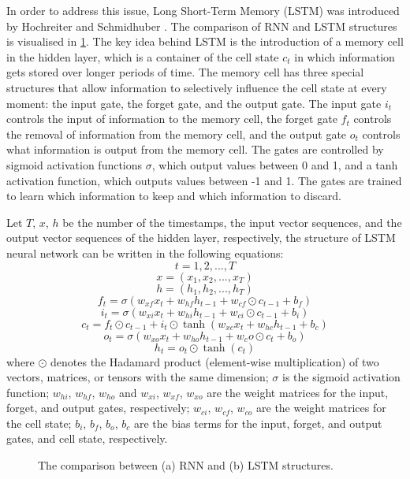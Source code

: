 \documentclass[11pt]{uonthesis}
\begin{document}
In order to address this issue, Long Short-Term Memory (LSTM) was introduced by Hochreiter and Schmidhuber \cite{lstm}. The comparison of RNN and LSTM structures is visualised in \ref{fig:rnnvslstm}. The key idea behind LSTM is the introduction of a memory cell in the hidden layer, which is a container of the cell state $c_t$ in which information gets stored over longer periods of time. The memory cell has three special structures that allow information to selectively influence the cell state at every moment: the input gate, the forget gate, and the output gate. The input gate $i_t$ controls the input of information to the memory cell, the forget gate $f_t$ controls the removal of information from the memory cell, and the output gate $o_t$ controls what information is output from the memory cell. The gates are controlled by sigmoid activation functions $\sigma$, which output values between 0 and 1, and a tanh activation function, which outputs values between -1 and 1. The gates are trained to learn which information to keep and which information to discard.

Let $T$, $x$, $h$ be the number of the timestamps, the input vector sequences, and the output vector sequences of the hidden layer, respectively, the structure of LSTM neural network can be written in the following equations:
\[t = 1, 2, ..., T\]
\[x = (x_{1}, x_{2},..., x_T)\]
\[h = (h_{1}, h_{2},..., h_T)\]
\[f_t = \sigma(w_{xf} x_t + w_{hf} h_{t-1} + w_{cf} \odot c_{t-1} + b_f )\]
\[i_t = \sigma(w_{xi} x_t + w_{hi} h_{t-1} + w_{ci} \odot c_{t-1} + b_i )\]
\[c_t = f_t \odot c_{t-1} + i_t \odot \tanh(w_{xc} x_t + w_{hc} h_{t-1} + b_c)\] 
\[o_t = \sigma(w_{xo} x_t + w_{ho} h_{t-1} + w_co \odot c_t + b_o)\]
\[h_t = o_t \odot \tanh(c_t)\]
where
$\odot$ denotes the Hadamard product (element-wise multiplication) of two vectors, matrices, or tensors with the same dimension;
$\sigma$ is the sigmoid activation function;
$w_{hi}$, $w_{hf}$, $w_{ho}$ and $w_{xi}$, $w_{xf}$, $w_{xo}$ are the weight matrices for the input, forget, and output gates, respectively;
$w_{ci}$, $w_{cf}$, $w_{co}$ are the weight matrices for the cell state;
$b_i$, $b_f$, $b_o$, $b_c$ are the bias terms for the input, forget, and output gates, and cell state, respectively.


\begin{figure}[ht!]
    \centering
\caption{The comparison between (a) RNN and (b) LSTM structures.}
\label{fig:rnnvslstm}
\end{figure}
\end{document}
